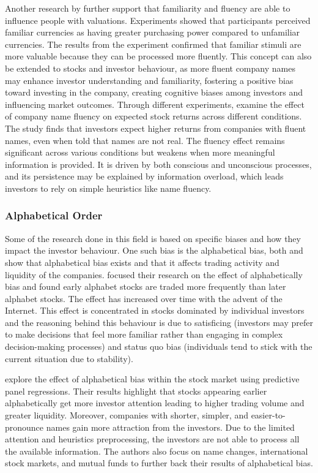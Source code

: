 \documentclass[a4paper,11pt]{report}
\begin{document}
Another research by  further support that familiarity and fluency are able to influence people with valuations. Experiments showed that participants perceived familiar currencies as having greater purchasing power compared to unfamiliar currencies. The results from the experiment confirmed that familiar stimuli are more valuable because they can be processed more fluently. This concept can also be extended to stocks and investor behaviour, as more fluent company names may enhance investor understanding and familiarity, fostering a positive bias toward investing in the company, creating cognitive biases among investors and influencing market outcomes. Through different experiments,  examine the effect of company name fluency on expected stock returns across different conditions. The study finds that investors expect higher returns from companies with fluent names, even when told that names are not real. The fluency effect remains significant across various conditions but weakens when more meaningful information is provided. It is driven by both conscious and unconscious processes, and its persistence may be explained by information overload, which leads investors to rely on simple heuristics like name fluency. 


\subsubsection{Alphabetical Order}
Some of the research done in this field is based on specific biases and how they impact the investor behaviour. One such bias is the alphabetical bias, both  and  show that alphabetical bias exists and that it affects trading activity and liquidity of the companies.  focused their research on the effect of alphabetically bias and found early alphabet stocks are traded more frequently than later alphabet stocks. The effect has increased over time with the advent of the Internet. This effect is concentrated in stocks dominated by individual investors and the reasoning behind this behaviour is due to satisficing (investors may prefer to make decisions that feel more familiar rather than engaging in complex decision-making processes) and status quo bias (individuals tend to stick with the current situation due to stability). 

 explore the effect of alphabetical bias within the stock market using predictive panel regressions. Their results highlight that stocks appearing earlier alphabetically get more investor attention leading to higher trading volume and greater liquidity. Moreover, companies with shorter, simpler, and easier-to-pronounce names gain more attraction from the investors. Due to the limited attention and heuristics preprocessing, the investors are not able to process all the available information. The authors also focus on name changes, international stock markets, and mutual funds to further back their results of alphabetical bias. 
\end{document}
